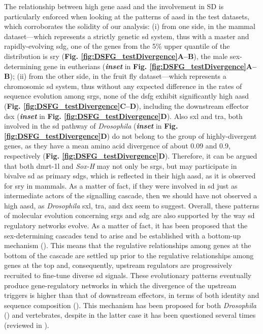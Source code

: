 \documentclass[../main.tex]{subfiles}
\begin{document}
The relationship between high gene \gls{aasd} and the involvement in SD is particularly enforced when looking at the patterns of \gls{aasd} in the test datasets, which corroborates the solidity of our analysis: (i) from one side, in the mammal dataset—which represents a strictly genetic \gls{sd} system, thus with a master and rapidly-evolving \gls{sdg}, one of the genes from the 5\% upper quantile of the distribution is \gls{sry} (\textbf{Fig. \ref{fig:DSFG_testDivergence}A--B}), the male sex-determining gene in eutherians (\textbf{\textit{inset}} in \textbf{Fig. \ref{fig:DSFG_testDivergence}A--B}); (ii) from the other side, in the fruit fly dataset—which represents a chromosomic \gls{sd} system, thus without any expected difference in the rates of sequence evolution among \glspl{srg}, none of the \gls{dsfg} exhibit significantly high \gls{aasd} (\textbf{Fig. \ref{fig:DSFG_testDivergence}C--D}), including the downstream effector \gls{dsx} (\textit{\textbf{inset}} in \textbf{Fig. \ref{fig:DSFG_testDivergence}D}). Also \gls{sxl} and \gls{tra}, both involved in the \gls{sd} pathway of \textit{Drosophila} (\textit{\textbf{inset}} in \textbf{Fig. \ref{fig:DSFG_testDivergence}D}) do not belong to the group of highly-divergent genes, as they have a mean amino acid divergence of about 0.09 and 0.9, respectively (\textbf{Fig. \ref{fig:DSFG_testDivergence}D}). Therefore, it can be argued that both \gls{dmrt-1l} and \textit{Sox-H} may not only be \glspl{srg}, but may participate in bivalve \gls{sd} as primary \glspl{sdg}, which is reflected in their high \gls{aasd}, as it is observed for \gls{sry} in mammals. As a matter of fact, if they were involved in \gls{sd} just as intermediate actors of the signalling cascade, then we should have not observed a high \gls{aasd}, as \textit{Drosophila} \gls{sxl}, \gls{tra}, and \gls{dsx} seem to suggest. Overall, these patterns of molecular evolution concerning \glspl{srg} and \gls{sdg} are also supported by the way \gls{sd} regulatory networks evolve. As a matter of fact, it has been proposed that the sex-determining cascades tend to arise and be established with a bottom-up mechanism (\textbf{\cite{wilkins1995moving, mullon2012drosophila_sxl, beukeboom2014evolution, capel2017vertebrate}}). This means that the regulative relationships among genes at the bottom of the cascade are settled up prior to the regulative relationships among genes at the top and, consequently, upstream regulators are progressively recruited to fine-tune diverse \gls{sd} signals. These evolutionary patterns eventually produce gene-regulatory networks in which the divergence of the upstream triggers is higher than that of downstream effectors, in terms of both identity and sequence composition (\textbf{\cite{beukeboom2014evolution}}). This mechanism has been proposed for both \textit{Drosophila} (\textbf{\cite{mullon2012drosophila_sxl}}) and vertebrates, despite in the latter case it has been questioned several times (reviewed in \textbf{\cite{capel2017vertebrate}}).
\end{document}
